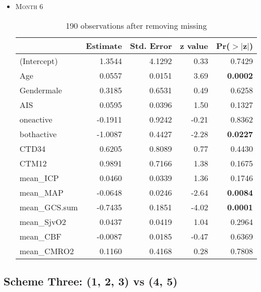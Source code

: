 \documentclass{article}
\begin{document}
\begin{itemize}
\item \textsc{Month 6}
\begin{table}[H]
\caption{190 observations after removing missing}
\centering
\begin{tabular}{lrrrr}
  \hline
 & Estimate & Std. Error & z value & Pr($>$$|$z$|$) \\ 
  \hline
(Intercept) & 1.3544 & 4.1292 & 0.33 & 0.7429 \\ 
  Age & 0.0557 & 0.0151 & 3.69 & {\bf 0.0002} \\ 
  Gendermale & 0.3185 & 0.6531 & 0.49 & 0.6258 \\ 
  AIS & 0.0595 & 0.0396 & 1.50 & 0.1327 \\ 
  oneactive & -0.1911 & 0.9242 & -0.21 & 0.8362 \\ 
  bothactive & -1.0087 & 0.4427 & -2.28 & {\bf 0.0227} \\ 
  CTD34 & 0.6205 & 0.8089 & 0.77 & 0.4430 \\ 
  CTM12 & 0.9891 & 0.7166 & 1.38 & 0.1675 \\ 
  mean\_ICP & 0.0460 & 0.0339 & 1.36 & 0.1746 \\ 
  mean\_MAP & -0.0648 & 0.0246 & -2.64 & {\bf 0.0084} \\ 
  mean\_GCS.sum & -0.7435 & 0.1851 & -4.02 & {\bf 0.0001} \\ 
  mean\_SjvO2 & 0.0437 & 0.0419 & 1.04 & 0.2964 \\ 
  mean\_CBF & -0.0087 & 0.0185 & -0.47 & 0.6369 \\ 
  mean\_CMRO2 & 0.1160 & 0.4168 & 0.28 & 0.7808 \\ 
   \hline
\end{tabular}
\end{table}

\end{itemize}



\newpage
\subsection{Scheme Three: (1, 2, 3) vs (4, 5)}
\end{document}
